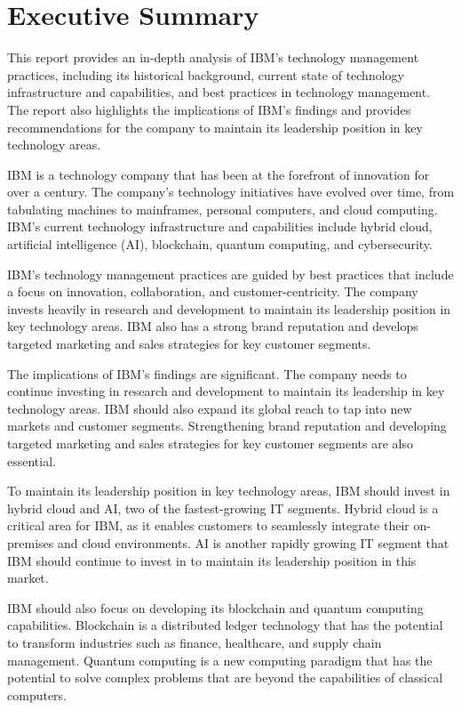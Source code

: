 \section*{Executive Summary}
This report provides an in-depth analysis of IBM's technology management practices, including its historical background, current state of technology infrastructure and capabilities, and best practices in technology management. The report also highlights the implications of IBM's findings and provides recommendations for the company to maintain its leadership position in key technology areas.

IBM is a technology company that has been at the forefront of innovation for over a century. The company's technology initiatives have evolved over time, from tabulating machines to mainframes, personal computers, and cloud computing. IBM's current technology infrastructure and capabilities include hybrid cloud, artificial intelligence (AI), blockchain, quantum computing, and cybersecurity.

IBM's technology management practices are guided by best practices that include a focus on innovation, collaboration, and customer-centricity. The company invests heavily in research and development to maintain its leadership position in key technology areas. IBM also has a strong brand reputation and develops targeted marketing and sales strategies for key customer segments.

The implications of IBM's findings are significant. The company needs to continue investing in research and development to maintain its leadership in key technology areas. IBM should also expand its global reach to tap into new markets and customer segments. Strengthening brand reputation and developing targeted marketing and sales strategies for key customer segments are also essential.

To maintain its leadership position in key technology areas, IBM should invest in hybrid cloud and AI, two of the fastest-growing IT segments. Hybrid cloud is a critical area for IBM, as it enables customers to seamlessly integrate their on-premises and cloud environments. AI is another rapidly growing IT segment that IBM should continue to invest in to maintain its leadership position in this market.

IBM should also focus on developing its blockchain and quantum computing capabilities. Blockchain is a distributed ledger technology that has the potential to transform industries such as finance, healthcare, and supply chain management. Quantum computing is a new computing paradigm that has the potential to solve complex problems that are beyond the capabilities of classical computers.


